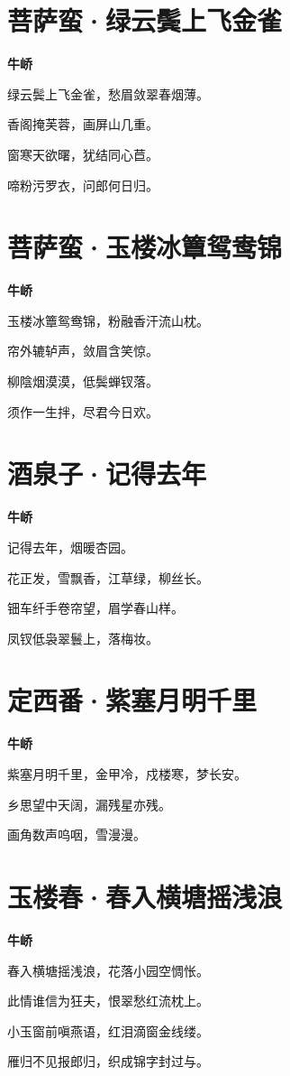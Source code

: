 \documentclass[12pt,a4paper]{ctexbook}
\begin{document}
\section{菩萨蛮·绿云鬓上飞金雀}
\textbf{牛峤}\par\vspace{0.5em}
绿云鬓上飞金雀，愁眉敛翠春烟薄。\par
香阁掩芙蓉，画屏山几重。\par
窗寒天欲曙，犹结同心苣。\par
啼粉污罗衣，问郎何日归。\par

\section{菩萨蛮·玉楼冰簟鸳鸯锦}
\textbf{牛峤}\par\vspace{0.5em}
玉楼冰簟鸳鸯锦，粉融香汗流山枕。\par
帘外辘轳声，敛眉含笑惊。\par
柳陰烟漠漠，低鬓蝉钗落。\par
须作一生拌，尽君今日欢。\par

\section{酒泉子·记得去年}
\textbf{牛峤}\par\vspace{0.5em}
记得去年，烟暖杏园。\par
花正发，雪飘香，江草绿，柳丝长。\par
钿车纤手卷帘望，眉学春山样。\par
凤钗低袅翠鬟上，落梅妆。\par

\section{定西番·紫塞月明千里}
\textbf{牛峤}\par\vspace{0.5em}
紫塞月明千里，金甲冷，戍楼寒，梦长安。\par
乡思望中天阔，漏残星亦残。\par
画角数声呜咽，雪漫漫。\par

\section{玉楼春·春入横塘摇浅浪}
\textbf{牛峤}\par\vspace{0.5em}
春入横塘摇浅浪，花落小园空惆怅。\par
此情谁信为狂夫，恨翠愁红流枕上。\par
小玉窗前嗔燕语，红泪滴窗金线缕。\par
雁归不见报郎归，织成锦字封过与。\par
\end{document}
